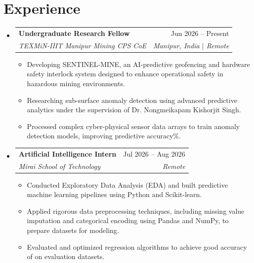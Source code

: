 \documentclass[11pt,a4paper]{article}
\makeatletter
\newcommand{\resumeSubheading}[4]{
    \begin{tabular*}{1\textwidth}[t]{l@{\extracolsep{\fill}}r}
      \textbf{#1} & #2 \\
      \textit{#3} & \textit{#4} \\
    \end{tabular*}\vspace{-4pt}
}
\makeatother
\begin{document}
\section{Experience}
\begin{itemize}[leftmargin=0in, label={}, itemsep=2pt]

  \item \resumeSubheading
    {Undergraduate Research Fellow}{Jun 2026 -- Present}
    {TEXMiN-IIIT Manipur Mining CPS CoE}{Manipur, India $|$ Remote}
    \begin{itemize}[leftmargin=0.15in, label={\textbullet}, topsep=2pt, itemsep=0pt]
      \item \small{Developing SENTINEL-MINE, an AI-predictive geofencing and hardware safety interlock system designed to enhance operational safety in hazardous mining environments.}
      \item \small{Researching sub-surface anomaly detection using advanced predictive analytics under the supervision of Dr. Nongmeikapam Kishorjit Singh.}
      \item \small{Processed complex cyber-physical sensor data arrays to train anomaly detection models, improving predictive accuracy\%.}
    \end{itemize}

  \item \resumeSubheading
    {Artificial Intelligence Intern}{Jul 2026 -- Aug 2026}
    {Mirai School of Technology}{Remote}
    \begin{itemize}[leftmargin=0.15in, label={\textbullet}, topsep=2pt, itemsep=0pt]
      \item \small{Conducted Exploratory Data Analysis (EDA) and built predictive machine learning pipelines using Python and Scikit-learn.}
      \item \small{Applied rigorous data preprocessing techniques, including missing value imputation and categorical encoding using Pandas and NumPy, to prepare datasets for modeling.}
      \item \small{Evaluated and optimized regression algorithms to achieve good accuracy of on evaluation datasets.}
    \end{itemize}

\end{itemize}

\end{document}
